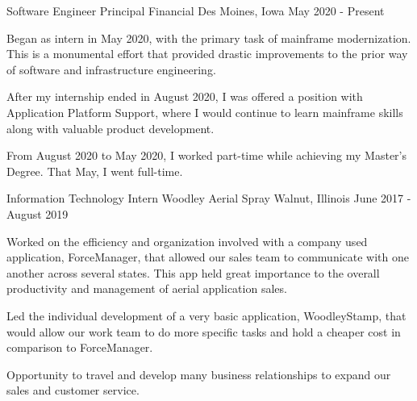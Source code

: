 \begin{cventries}
    \cventry
    {Software Engineer} %
    {Principal Financial} %
    {Des Moines, Iowa} %
    {May 2020 - Present} %
    {
      \begin{cvitems} %
        \item {Began as intern in May 2020, with the primary task of mainframe       modernization. This is a monumental effort that provided drastic         improvements to the prior way of software and infrastructure             engineering.}
        \item {After my internship ended in August 2020, I was offered a position     with Application Platform Support, where I would continue to learn       mainframe skills along with valuable product development.}
        \item {From August 2020 to May 2020, I worked part-time while                achieving my Master's Degree. That May, I went full-time.}
      \end{cvitems}
    }
    
    \cventry
    {Information Technology Intern} %
    {Woodley Aerial Spray} %
    {Walnut, Illinois} %
    {June 2017 - August 2019} %
    {
      \begin{cvitems} %
        \item {Worked on the efficiency and organization involved with a company     used application, ForceManager, that allowed our sales team to           communicate with one another across several states. This app held        great importance to the overall productivity and management of aerial     application sales.}
        \item {Led the individual development of a very basic application,           WoodleyStamp, that would allow our work team to do more specific         tasks and hold a cheaper cost in comparison to ForceManager.}
        \item {Opportunity to travel and develop many business relationships to      expand our sales and customer service.}
      \end{cvitems}
    }
    

\end{cventries}

